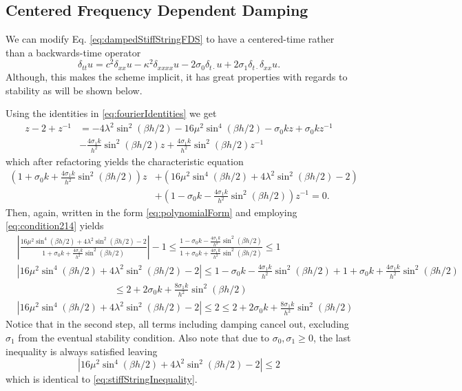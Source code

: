\documentclass{article}
\begin{document}
\subsection{Centered Frequency Dependent Damping}
We can modify Eq. \eqref{eq:dampedStiffStringFDS} to have a centered-time rather than a backwards-time operator 
\begin{equation}
    \delta_{tt}u=c^2\delta_{xx}u-\kappa^2\delta_{xxxx}u-2\sigma_0\delta_{t\cdot}u+2\sigma_1\delta_{t\cdot}\delta_{xx}u.
\end{equation}
Although, this makes the scheme implicit, it has great properties with regards to stability as will be shown below. 

Using the identities in \eqref{eq:fourierIdentities} we get
\begin{equation}
\begin{aligned}
    z - 2 + z^{-1} &= -4\lambda^2\sin^2(\beta h/2) - 16\mu^2\sin^4(\beta h/2) - \sigma_0kz + \sigma_0k z^{-1} \\
    &- \frac{4 \sigma_1 k}{h^2}\sin^2(\beta h/2)z + \frac{4 \sigma_1 k}{h^2} \sin^2(\beta h/2)z^{-1}
    \end{aligned}
\end{equation}
which after refactoring yields the characteristic equation
\begin{equation}
    \begin{aligned}
        \left(1+\sigma_0k + \frac{4\sigma_1k}{h^2}\sin^2(\beta h/2)\right)z &+ \left(16\mu^2\sin^4(\beta h/2)+4\lambda^2\sin^2(\beta h/2) - 2\right)\\
        & + \left(1-\sigma_0k - \frac{4\sigma_1k}{h^2}\sin^2(\beta h/2)\right)z^{-1} = 0.
    \end{aligned}
\end{equation}
Then, again, written in the form \eqref{eq:polynomialForm} and employing \eqref{eq:condition214} yields
\begin{align*}
    &\left|\frac{16\mu^2\sin^4(\beta h/2)+4\lambda^2\sin^2(\beta h/2) - 2}{1+\sigma_0k + \frac{4\sigma_1k}{h^2}\sin^2(\beta h/2)} \right|-1 \leq \frac{1-\sigma_0k - \frac{4\sigma_1k}{h^2}\sin^2(\beta h/2)}{1+\sigma_0k + \frac{4\sigma_1k}{h^2}\sin^2(\beta h/2)}\leq 1\\
    &\left|16\mu^2\sin^4(\beta h/2)+4\lambda^2\sin^2(\beta h/2) - 2 \right|\leq1-\sigma_0k - \frac{4\sigma_1k}{h^2}\sin^2(\beta h/2)+ 1+\sigma_0k + \frac{4\sigma_1k}{h^2}\sin^2(\beta h/2)\\
    &\qquad\qquad\qquad\qquad\qquad\leq 2+2\sigma_0k + \frac{8\sigma_1k}{h^2}\sin^2(\beta h/2)\\
    &\left|16\mu^2\sin^4(\beta h/2)+4\lambda^2\sin^2(\beta h/2) - 2 \right|\leq 2 \leq 2+2\sigma_0k + \frac{8\sigma_1k}{h^2}\sin^2(\beta h/2)
\end{align*}
Notice that in the second step, all terms including damping cancel out, excluding $\sigma_1$ from the eventual stability condition. Also note that due to $\sigma_0, \sigma_1 \geq 0$, the last inequality is always satisfied leaving
\begin{equation}
    \left|16\mu^2\sin^4(\beta h/2)+4\lambda^2\sin^2(\beta h/2) - 2 \right|\leq 2
\end{equation}
which is identical to \eqref{eq:stiffStringInequality}.
\end{document}
